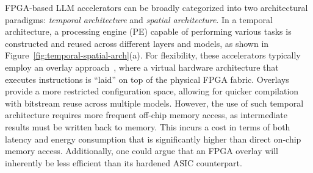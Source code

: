 FPGA-based LLM accelerators can be broadly categorized into two architectural paradigms: \emph{temporal architecture} and \emph{spatial architecture}.
In a temporal architecture, a processing engine (PE) capable of performing various tasks is constructed and reused across different layers and models, as shown in Figure~\ref{fig:temporal-spatial-arch}(a). For flexibility, these accelerators typically employ an overlay approach~\cite{hong2022dfx,li2020ftrans,khan2021npe}, where a virtual hardware architecture that executes instructions is ``laid'' on top of the physical FPGA fabric. Overlays provide a more restricted configuration space, allowing for quicker compilation with bitstream reuse across multiple models. However, the use of such temporal architecture requires more frequent off-chip memory access, as intermediate results must be written back to memory. This incurs a cost in terms of both latency and energy consumption that is significantly higher than direct on-chip memory access. Additionally, one could argue that an FPGA overlay will inherently be less efficient than its hardened ASIC counterpart.

